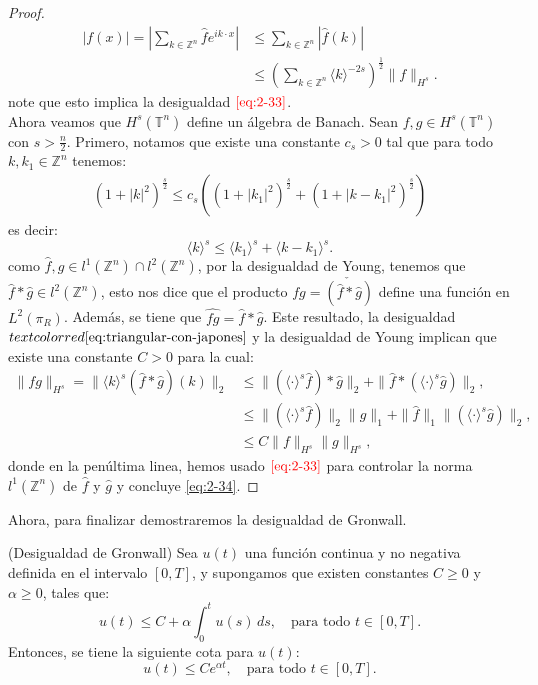 \begin{proof}
\begin{align*}
        |f(x)|=\left| \sum_{k\in\mathbb{Z}^{n}}\hat{f}e^{ik\cdot x} \right|&\leq \sum_{k\in\mathbb{Z}^{n}}|\hat{f}(k)|\\
        &\leq \left( \sum_{k\in\mathbb{Z}^{n}} \langle k \rangle^{-2s}\right)^{\frac{1}{2}}\|f\|_{H^s}.
      \end{align*}
      note que esto implica la desigualdad $\textcolor{red}{\ref{eq:2-33}}$.\\
      Ahora veamos que $H^s(\mathbb{T}^{n})$ define un álgebra de Banach. Sean $f,g\in H^s(\mathbb{T}^{n})$ con $s>\frac{n}{2}$. Primero, notamos que existe una constante $c_s>0$ tal que para todo $k,k_1\in\mathbb{Z}^{n}$ tenemos:
      \begin{align*}
        (1+|k|^2)^{\frac{s}{2}}\leq c_s((1+|k_1|^2)^{\frac{s}{2}}+(1+|k-k_1|^2)^{\frac{s}{2}})
      \end{align*}
      es decir:
      \begin{equation}
        \langle k \rangle^{s}\leq \langle k_1 \rangle^{s}+\langle k-k_1 \rangle^{s}.\label{eq:triangular-con-japones}  
      \end{equation}
      como $\hat{f},\hat{g}\in l^1(\mathbb{Z}^{n})\cap l^2(\mathbb{Z}^{n})$, por la desigualdad de Young, tenemos que $\hat{f}*\hat{g}\in l^2(\mathbb{Z}^{n})$, esto nos dice que el producto $fg=\check{(\hat{f}*\hat{g})}$ define una función en $L^2(\pi_R)$. Además, se tiene que $\hat{fg}=\hat{f}*\hat{g}$. Este resultado, la desigualdad $textcolor{red}{\ref{eq:triangular-con-japones}}$ y la desigualdad de Young implican que existe una constante $C>0$ para la cual:
      \begin{align*}
        \|fg\|_{H^s}=\|\langle k \rangle^{s}(\hat{f}*\hat{g})(k)\|_{2}&\leq \|(\langle \cdot \rangle^{s}\hat{f})*\hat{g}\|_{2}+\|\hat{f}*(\langle \cdot \rangle^{s}\hat{g})\|_{2},\\
        &\leq \|(\langle \cdot \rangle^{s}\hat{f})\|_{2}\|\hat{g}\|_{1}+\|\hat{f}\|_{1}\|(\langle \cdot \rangle^{s}\hat{g})\|_{2},\\
        &\leq C \|f\|_{H^s}\|g\|_{H^s},
      \end{align*}
      donde en la penúltima linea, hemos usado $\textcolor{red}{\ref{eq:2-33}}$ para controlar la norma $l^1(\mathbb{Z}^{n})$ de $\hat{f}$ y $\hat{g}$ y concluye \textcolor{red}{\ref{eq:2-34}}. 
    \end{proof}
    Ahora, para finalizar demostraremos la desigualdad de Gronwall.
    \begin{theorem}(Desigualdad de Gronwall)\label{theorem:desigualdad-de-gronwall}
      Sea $u(t)$  una función continua y no negativa definida en el intervalo $[0, T]$, y supongamos que existen constantes $C \geq 0$ y $\alpha \geq 0$, tales que:
      $$u(t) \leq C + \alpha \int_0^t u(s) \, ds, \quad \text{para todo } t \in [0, T].$$
      Entonces, se tiene la siguiente cota para $u(t)$:
      $$u(t) \leq C e^{\alpha t}, \quad \text{para todo } t \in [0, T].$$
    \end{theorem}
